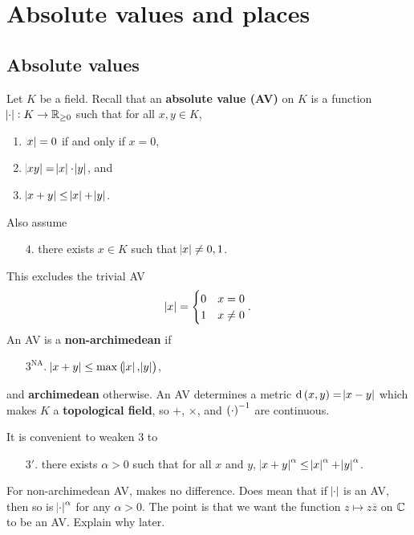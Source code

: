 \def\module{Algebraic Number Theory}
\def\lecturer{Dr Anthony Scholl}
\def\term{Lent 2020}
\def\cover{}
\def\syllabus{}
\def\thm{section}







\setcounter{section}{0}

\section{Absolute values and places}

\subsection{Absolute values}


Let $ K $ be a field. Recall that an \textbf{absolute value (AV)} on $ K $ is a function $ \abs{\cdot} : K \to \mathbb{R}_{\ge 0} $ such that for all $ x, y \in K $,
\begin{enumerate}
\item $ \abs{x} = 0 $ if and only if $ x = 0 $,
\item $ \abs{xy} = \abs{x} \cdot \abs{y} $, and
\item $ \abs{x + y} \le \abs{x} + \abs{y} $.
\end{enumerate}
Also assume
\begin{itemize}
\item[$ 4 $.] there exists $ x \in K $ such that $ \abs{x} \ne 0, 1 $.
\end{itemize}
This excludes the trivial AV
$$ \abs{x} =
\begin{cases}
0 & x = 0 \\
1 & x \ne 0
\end{cases}.
$$
An AV is a \textbf{non-archimedean} if
\begin{itemize}
\item[$ 3^{\text{NA}} $.] $ \abs{x + y} \le \max\br{\abs{x}, \abs{y}} $,
\end{itemize}
and \textbf{archimedean} otherwise. An AV determines a metric $ \d\br{x, y} = \abs{x - y} $ which makes $ K $ a \textbf{topological field}, so $ + $, $ \times $, and $ \br{\cdot}^{-1} $ are continuous.

\begin{remark*}
It is convenient to weaken $ 3 $ to
\begin{itemize}
\item[$ 3' $.] there exists $ \alpha > 0 $ such that for all $ x $ and $ y $, $ \abs{x + y}^\alpha \le \abs{x}^\alpha + \abs{y}^\alpha $.
\end{itemize}
For non-archimedean AV, makes no difference. Does mean that if $ \abs{\cdot} $ is an AV, then so is $ \abs{\cdot}^\alpha $ for any $ \alpha > 0 $. The point is that we want the function $ z \mapsto z\overline{z} $ on $ \mathbb{C} $ to be an AV. Explain why later.
\end{remark*}

